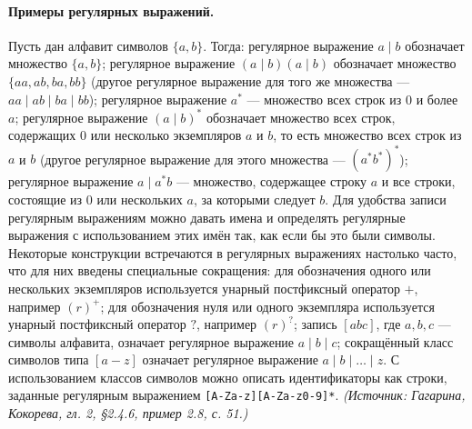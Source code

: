 \documentclass[a4paper,12pt]{article}
\begin{document}
\paragraph{Примеры регулярных выражений.}
Пусть дан алфавит символов \(\{a,b\}\). Тогда: регулярное выражение \(a\mid b\) обозначает множество \(\{a,b\}\); регулярное выражение \((a\mid b)(a\mid b)\) обозначает множество \(\{aa,ab,ba,bb\}\) (другое регулярное выражение для того же множества — \(aa\mid ab\mid ba\mid bb\)); регулярное выражение \(a^*\) — множество всех строк из 0 и более \(a\); регулярное выражение \((a\mid b)^*\) обозначает множество всех строк, содержащих 0 или несколько экземпляров \(a\) и \(b\), то есть множество всех строк из \(a\) и \(b\) (другое регулярное выражение для этого множества — \((a^*b^*)^*\)); регулярное выражение \(a\mid a^*b\) — множество, содержащее строку \(a\) и все строки, состоящие из 0 или нескольких \(a\), за которыми следует \(b\). Для удобства записи регулярным выражениям можно давать имена и определять регулярные выражения с использованием этих имён так, как если бы это были символы. Некоторые конструкции встречаются в регулярных выражениях настолько часто, что для них введены специальные сокращения: для обозначения одного или нескольких экземпляров используется унарный постфиксный оператор \(+\), например \((r)^+\); для обозначения нуля или одного экземпляра используется унарный постфиксный оператор \(?\), например \((r)^?\); запись \([abc]\), где \(a,b,c\) — символы алфавита, означает регулярное выражение \(a\mid b\mid c\); сокращённый класс символов типа \([a-z]\) означает регулярное выражение \(a\mid b\mid\ldots\mid z\). С использованием классов символов можно описать идентификаторы как строки, заданные регулярным выражением \texttt{[A-Za-z][A-Za-z0-9]*}.
\textit{(Источник: Гагарина, Кокорева, гл. 2, §2.4.6, пример 2.8, с. 51.)}
\end{document}

